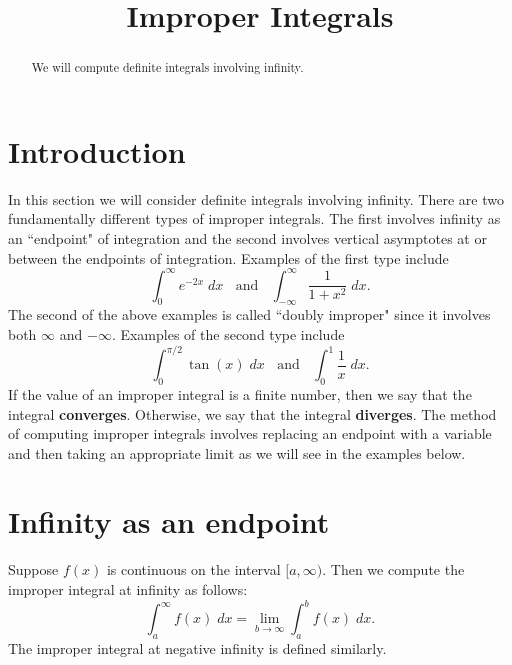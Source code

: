 \documentclass{ximera}
\title{Improper Integrals}
\begin{document}
\begin{abstract}
We will compute definite integrals involving infinity.
\end{abstract}

\maketitle

\section{Introduction}
In this section we will consider definite integrals involving infinity.
There are two fundamentally different types of improper integrals.  The first involves infinity as an ``endpoint"
of integration and the second involves vertical asymptotes at or between the endpoints of integration.
Examples of the first type include
\[
\int_0^\infty e^{-2x} \; dx \; \; \text{ and } \;  \; \int_{-\infty}^\infty \frac{1}{1+x^2}\; dx.
\]
The second of the above examples is called ``doubly improper" since it involves both $\infty$ and $-\infty$.
Examples of the second type include
\[
\int_0^{\pi/2} \tan(x)\; dx \; \; \text{ and } \; \; \int_0^1 \frac{1}{x} \; dx.
\]
If the value of an improper integral is a finite number, then we say that the integral \textbf{converges}.
Otherwise, we say that the integral \textbf{diverges}.
The method of computing improper integrals involves replacing an endpoint with a variable 
and then taking an appropriate limit as we will see in the examples below.




\section{Infinity as an endpoint}
\begin{definition}
Suppose $f(x)$ is continuous on the interval $[a, \infty)$. Then we compute the improper integral at infinity as follows:
\[
\int_a^\infty f(x) \; dx = \lim_{b \to \infty} \int_a^b f(x) \; dx.
\]
The improper integral at negative infinity is defined similarly.
\end{definition}
\end{document}

